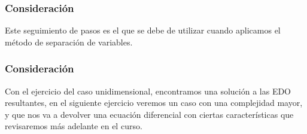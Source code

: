 \documentclass[12pt]{beamer}
\begin{document}
\begin{frame}
\frametitle{Consideración}
Este seguimiento de pasos es el que se debe de utilizar cuando aplicamos el método de separación de variables.
\end{frame}
\begin{frame}
\frametitle{Consideración}
Con el ejercicio del caso unidimensional, encontramos una solución a las EDO resultantes, en el siguiente ejercicio veremos un caso con una complejidad mayor, y que nos va a devolver una ecuación diferencial con ciertas características que revisaremos más adelante en el curso.
\end{frame}

\end{document}

